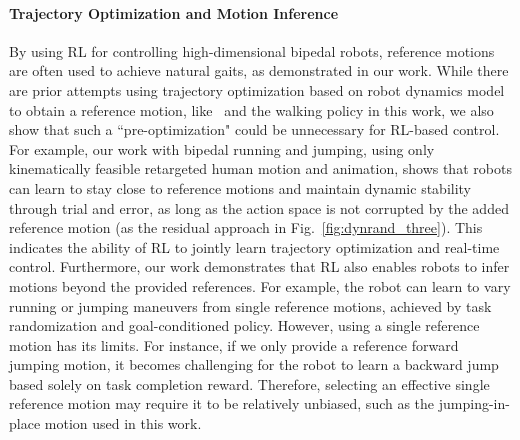 \paragraph{Trajectory Optimization and Motion Inference}
By using RL for controlling high-dimensional bipedal robots, reference motions are often used to achieve natural gaits, as demonstrated in our work. 
While there are prior attempts using trajectory optimization based on robot dynamics model to obtain a reference motion, like~\cite{bogdanovic2022model} and the walking policy in this work, we also show that such a “pre-optimization" could be unnecessary for RL-based control.
For example, our work with bipedal running and jumping, using only kinematically feasible retargeted human motion and animation, shows that robots can learn to stay close to reference motions and maintain dynamic stability through trial and error, as long as the action space is not corrupted by the added reference motion (as the residual approach in Fig.~\ref{fig:dynrand_three}).
This indicates the ability of RL to jointly learn trajectory optimization and real-time control. 
Furthermore, our work demonstrates that RL also enables robots to infer motions beyond the provided references. 
For example, the robot can learn to vary running or jumping maneuvers from single reference motions, achieved by task randomization and goal-conditioned policy.
However, using a single reference motion has its limits. 
For instance, if we only provide a reference forward jumping motion, it becomes challenging for the robot to learn a backward jump based solely on task completion reward. 
Therefore, selecting an effective single reference motion may require it to be relatively unbiased, such as the jumping-in-place motion used in this work.



